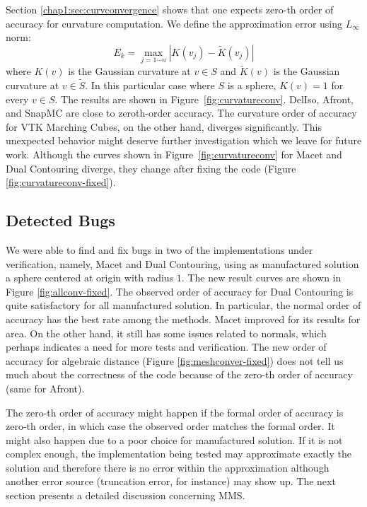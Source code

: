 Section \ref{chap1:sec:curvconvergence} shows that one expects zero-th order of accuracy for 
curvature computation. 
We define the approximation error using $L_\infty$ norm:
\begin{equation}
E_{k} = \max_{j=1\cdots n}|K(v_j) - \tilde{K}(v_j)|
\label{eq:curverror}
\end{equation}
where $K(v)$ is the Gaussian curvature at $v \in S$ and $\tilde{K}(v)$ is the Gaussian curvature at $v \in \tilde{S}$. In this
particular case where $S$ is a sphere, $K(v) = 1$ for every $v \in S$. The results 
are shown in Figure~\ref{fig:curvatureconv}.
DelIso, Afront, and SnapMC are close to zeroth-order accuracy. The
curvature order of accuracy for VTK Marching Cubes, on the other hand,
diverges significantly. This unexpected behavior might deserve further
investigation which we leave for future work.
Although the curves shown in Figure~\ref{fig:curvatureconv} for Macet and 
Dual Contouring diverge, they change after fixing the code 
(Figure \ref{fig:curvatureconv-fixed}).

\subsection{Detected Bugs}

We were able to find and fix bugs in two of the implementations 
under verification, namely, Macet and Dual Contouring, using as  
manufactured solution a sphere centered at origin with radius $1$. 
The new result curves are shown in Figure \ref{fig:allconv-fixed}. The observed 
order of accuracy for Dual Contouring is quite satisfactory for all manufactured 
solution. In particular, the normal order of accuracy has the best rate among the 
methods. Macet improved for its results for area. On the other hand, it still has 
some issues related to normals, which perhaps indicates a need for more tests 
and verification. The new order of accuracy for algebraic 
distance (Figure \ref{fig:meshconver-fixed}) does not tell us 
much about the correctness of the code because of the zero-th order 
of accuracy (same for Afront). 

The zero-th order of accuracy might happen if the formal order of accuracy 
is zero-th order, in which case the observed order matches the formal order. 
It might also happen due to a poor choice for manufactured solution. If 
it is not complex enough, the implementation being tested may approximate 
exactly the solution and therefore there is no error within the approximation 
although another error source (truncation error, for instance) may show up. 
The next section presents a detailed discussion concerning MMS.

